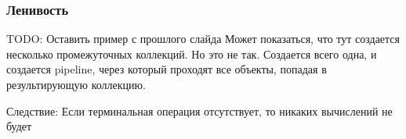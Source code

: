 \begin{frame}
\frametitle{Ленивость} %
TODO: Оставить пример с прошлого слайда
Может показаться, что тут создается несколько промежуточных коллекций. Но это не так. Создается всего одна, и создается pipeline, через который проходят все объекты, попадая в результирующую коллекцию.

Следствие: Если терминальная операция отсутствует, то никаких вычислений не будет
\end{frame}